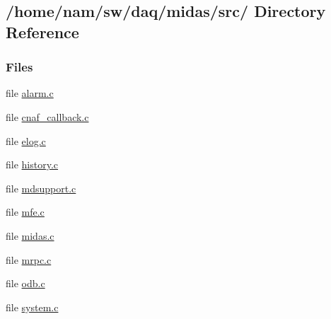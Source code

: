 \subsection{/home/nam/sw/daq/midas/src/ Directory Reference}
\label{dir_967645259cf3504d40df5943f0783e6b}
\subsubsection*{Files}
\begin{DoxyCompactItemize}
\item 
file \hyperlink{alarm_8c}{alarm.c}
\item 
file \hyperlink{cnaf__callback_8c}{cnaf\_\-callback.c}
\item 
file \hyperlink{elog_8c}{elog.c}
\item 
file \hyperlink{history_8c}{history.c}
\item 
file \hyperlink{mdsupport_8c}{mdsupport.c}
\item 
file \hyperlink{mfe_8c}{mfe.c}
\item 
file \hyperlink{midas_8c}{midas.c}
\item 
file \hyperlink{mrpc_8c}{mrpc.c}
\item 
file \hyperlink{odb_8c}{odb.c}
\item 
file \hyperlink{system_8c}{system.c}
\end{DoxyCompactItemize}
